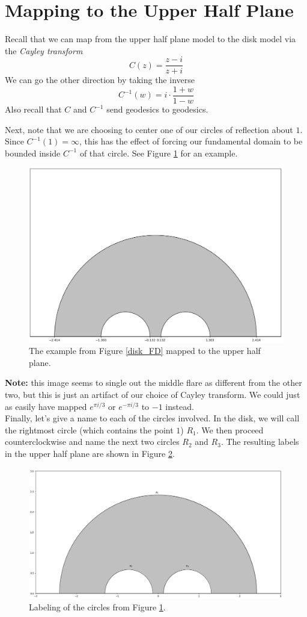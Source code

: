 \documentclass[]{article}
\begin{document}
\section*{Mapping to the Upper Half Plane}

Recall that we can map from the upper half plane model to the disk model via the \textit{Cayley transform}
$$
C(z) = \frac{z - i}{z + i}
$$
We can go the other direction by taking the inverse
$$
C^{-1}(w) = i\cdot\frac{1 + w}{1 - w}
$$
Also recall that $C$ and $C^{-1}$ send geodesics to geodesics.

Next, note that we are choosing to center one of our circles of reflection about $1$.
Since $C^{-1}(1) = \infty$, this has the effect of forcing our fundamental domain to be bounded inside $C^{-1}$ of that circle.
See Figure \ref{UHP_FD} for an example.

\begin{figure}[h]
	\centering
	\includegraphics[width=0.6\linewidth]{UHP_FD.png}
	\caption{The example from Figure \ref{disk_FD} mapped to the upper half plane.}
	\label{UHP_FD}
\end{figure}

\textbf{Note:} this image seems to single out the middle flare as different from the other two, but this is just an artifact of our choice of Cayley transform.
We could just as easily have mapped $e^{\pi i/3}$ or $e^{-\pi i/3}$ to $-1$ instead.
\\

Finally, let's give a name to each of the circles involved.
In the disk, we will call the rightmost circle (which contains the point $1$) $R_1$.
We then proceed counterclockwise and name the next two circles $R_2$ and $R_3$.
The resulting labels in the upper half plane are shown in Figure \ref{UHP_labeled}.

\begin{figure}[h]
	\centering
	\includegraphics[width=0.6\linewidth]{UHP_labeled.png}
	\caption{Labeling of the circles from Figure \ref{UHP_FD}.}
	\label{UHP_labeled}
\end{figure}
\end{document}
